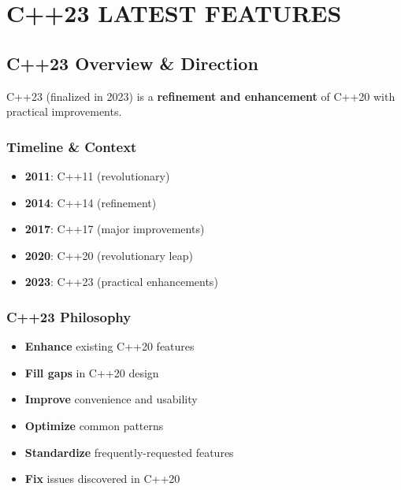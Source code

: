 \hypertarget{c23-latest-features}{%
\chapter{C++23 LATEST FEATURES}\label{c23-latest-features}}

\hypertarget{c23-overview-direction}{%
\section{C++23 Overview \& Direction}\label{c23-overview-direction}}

C++23 (finalized in 2023) is a \textbf{refinement and enhancement} of
C++20 with practical improvements.

\hypertarget{timeline-context}{%
\subsection{Timeline \& Context}\label{timeline-context}}

\begin{itemize}
\tightlist
\item
  \textbf{2011}: C++11 (revolutionary)
\item
  \textbf{2014}: C++14 (refinement)
\item
  \textbf{2017}: C++17 (major improvements)
\item
  \textbf{2020}: C++20 (revolutionary leap)
\item
  \textbf{2023}: C++23 (practical enhancements)
\end{itemize}

\hypertarget{c23-philosophy}{%
\subsection{C++23 Philosophy}\label{c23-philosophy}}

\begin{itemize}
\tightlist
\item
  \textbf{Enhance} existing C++20 features
\item
  \textbf{Fill gaps} in C++20 design
\item
  \textbf{Improve} convenience and usability
\item
  \textbf{Optimize} common patterns
\item
  \textbf{Standardize} frequently-requested features
\item
  \textbf{Fix} issues discovered in C++20
\end{itemize}

